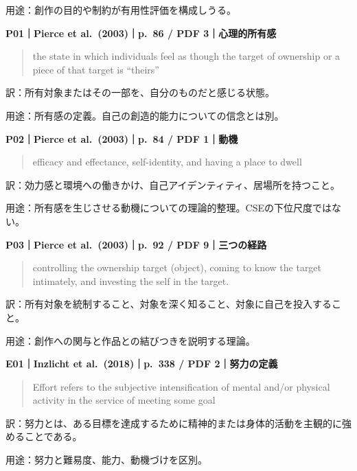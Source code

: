 \documentclass[
  11pt,
  a4paper,
]{article}
\begin{document}
用途：創作の目的や制約が有用性評価を構成しうる。


\textbf{P01｜Pierce et al.~(2003)｜p.~86 / PDF 3｜心理的所有感}

\begin{quote}
the state in which individuals feel as though the target of ownership or
a piece of that target is ``theirs''
\end{quote}

訳：所有対象またはその一部を、自分のものだと感じる状態。

用途：所有感の定義。自己の創造的能力についての信念とは別。


\textbf{P02｜Pierce et al.~(2003)｜p.~84 / PDF 1｜動機}

\begin{quote}
efficacy and effectance, self-identity, and having a place to dwell
\end{quote}

訳：効力感と環境への働きかけ、自己アイデンティティ、居場所を持つこと。

用途：所有感を生じさせる動機についての理論的整理。CSEの下位尺度ではない。


\textbf{P03｜Pierce et al.~(2003)｜p.~92 / PDF 9｜三つの経路}

\begin{quote}
controlling the ownership target (object), coming to know the target
intimately, and investing the self in the target.
\end{quote}

訳：所有対象を統制すること、対象を深く知ること、対象に自己を投入すること。

用途：創作への関与と作品との結びつきを説明する理論。


\textbf{E01｜Inzlicht et al.~(2018)｜p.~338 / PDF 2｜努力の定義}

\begin{quote}
Effort refers to the subjective intensification of mental and/or
physical activity in the service of meeting some goal
\end{quote}

訳：努力とは、ある目標を達成するために精神的または身体的活動を主観的に強めることである。

用途：努力と難易度、能力、動機づけを区別。
\end{document}
